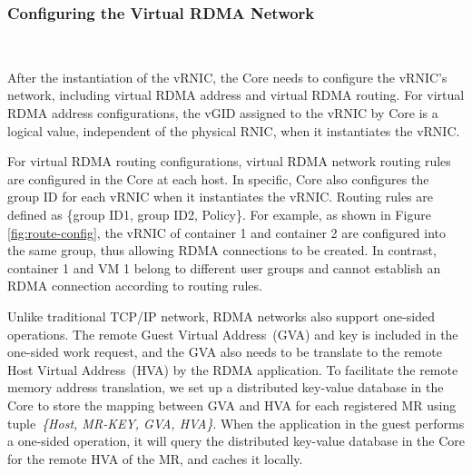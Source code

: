 \subsubsection{\textbf{Configuring the Virtual RDMA Network}}
\
\noindent

After the instantiation of the vRNIC, the \sys Core needs to configure the vRNIC's network, including virtual RDMA address and virtual RDMA routing.
For virtual RDMA address configurations, the vGID assigned to the vRNIC by \sys Core is a logical value, independent of the physical RNIC, when it instantiates the vRNIC.


For virtual RDMA routing configurations, virtual RDMA network routing rules are configured in the \sys Core at each host. In specific, \sys Core also configures the group ID for each vRNIC when it instantiates the vRNIC. Routing rules are defined as \{group ID1, group ID2, Policy\}. For example, as shown in Figure \ref{fig:route-config}, the vRNIC of container 1 and container 2 are configured into the same group, thus allowing RDMA connections to be created. In contrast, container 1 and VM 1 belong to different user groups and cannot establish an RDMA connection according to routing rules.


Unlike traditional TCP/IP network, RDMA networks also support one-sided operations. The remote Guest Virtual Address~(GVA) and key is included in the one-sided work request, and the GVA also needs to be translate to the remote Host Virtual Address~(HVA) by the RDMA application. To facilitate the remote memory address translation, we set up a distributed key-value database in the \sys Core to store the mapping between GVA and HVA for each registered MR using tuple~\textit{\{Host, MR-KEY, GVA, HVA\}}. When the application in the guest performs a one-sided operation, it will query the distributed key-value database in the \sys Core for the remote HVA of the MR, and caches it locally.

